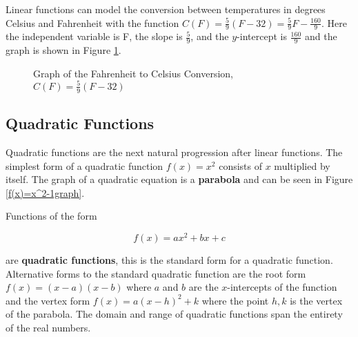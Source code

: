 \begin{example}
    Linear functions can model the conversion between temperatures in degrees Celsius and Fahrenheit with the function $C(F) = \frac{5}{9}(F - 32) = \frac{5}{9}F - \frac{160}{9}$. Here the independent variable is F, the slope is $\frac{5}{9}$, and the $y$-intercept is $\frac{160}{9}$ and the graph is shown in Figure \ref{FtoCgraph}.

    \begin{figure}[!ht]
        \centering
        \label{FtoCgraph}
        \caption{Graph of the Fahrenheit to Celsius Conversion, $C(F) = \frac{5}{9}(F-32)$}
    \end{figure}
\end{example}


\subsection{Quadratic Functions}
Quadratic functions are the next natural progression after linear functions. The simplest form of a quadratic function $f(x) = x^2$ consists of $x$ multiplied by itself. The graph of a quadratic equation is a \textbf{parabola} and can be seen in Figure \ref{f(x)=x^2-1graph}.

\begin{definition}
    Functions of the form

    \begin{equation}
        f(x) = ax^2 + bx + c
    \end{equation}

    \noindent are \textbf{quadratic functions}, this is the standard form for a quadratic function. Alternative forms to the standard quadratic function are the root form $f(x) = (x-a)(x-b)$ where $a$ and $b$ are the $x$-intercepts of the function and the vertex form $f(x) = a(x-h)^2+k$ where the point $h,k$ is the vertex of the parabola. The domain and range of quadratic functions span the entirety of the real numbers.
\end{definition}

